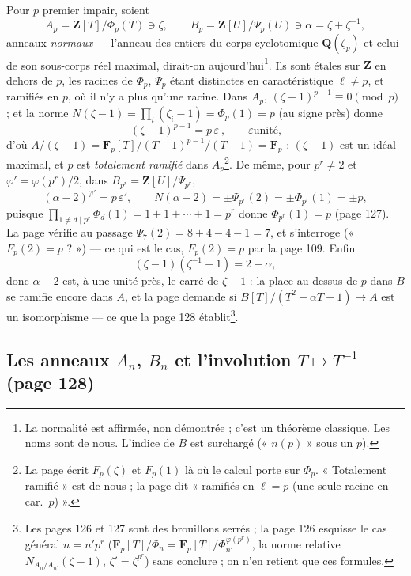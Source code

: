 \documentclass[11pt,a4paper]{article}
\begin{document}
Pour $p$ premier impair, soient
\[
  A_p = \mathbf{Z}[T]/\Phi_p(T) \ni \zeta, \qquad B_p = \mathbf{Z}[U]/\Psi_p(U)
  \ni \alpha = \zeta + \zeta^{-1} ,
\]
anneaux \emph{normaux} --- l'anneau des entiers du corps cyclotomique
$\mathbf{Q}(\zeta_p)$ et celui de son sous-corps réel maximal, dirait-on
aujourd'hui\footnote{La normalité est affirmée, non démontrée ; c'est un
théorème classique. Les noms sont de nous. L'indice de $B$ est surchargé
(« $n(p)$ » sous un $p$).}. Ils sont étales sur $\mathbf{Z}$ en dehors de $p$,
les racines de $\Phi_p$, $\Psi_p$ étant distinctes en caractéristique $\ell
\neq p$, et ramifiés en $p$, où il n'y a plus qu'une racine. Dans $A_p$,
$(\zeta - 1)^{p-1} \equiv 0 \pmod p$ ; et la norme $N(\zeta - 1) =
\prod_{i}(\zeta_i - 1) = \Phi_p(1) = p$ (au signe près) donne
\[
  \boxed{\ (\zeta - 1)^{p-1} = p\, \varepsilon\ }, \qquad \varepsilon \text{
  unité} ,
\]
d'où $A/(\zeta - 1) = \mathbf{F}_p[T]/(T - 1)^{p-1}/(T - 1) = \mathbf{F}_p$ :
$(\zeta - 1)$ est un idéal maximal, et $p$ est \emph{totalement ramifié} dans
$A_p$\footnote{La page écrit $F_p(\zeta)$ et $F_p(1)$ là où le calcul porte sur
$\Phi_p$. « Totalement ramifié » est de nous ; la page dit « ramifiés en
$\ell = p$ (une seule racine en car.\ $p$) ».}. De même, pour $p^r \neq 2$ et
$\varphi' = \varphi(p^r)/2$, dans $B_{p^r} = \mathbf{Z}[U]/\Psi_{p^r}$,
\[
  (\alpha - 2)^{\varphi'} = p\, \varepsilon', \qquad N(\alpha - 2) = \pm
  \Psi_{p^r}(2) = \pm \Phi_{p^r}(1) = \pm p ,
\]
puisque $\prod_{1 \neq d \mid p^r} \Phi_d(1) = 1 + 1 + \cdots + 1 = p^r$
donne $\Phi_{p^r}(1) = p$ (page 127). La page vérifie au passage
$\Psi_7(2) = 8 + 4 - 4 - 1 = 7$, et s'interroge (« $F_p(2) = p$ ? ») --- ce
qui est le cas, $F_p(2) = p$ par la page 109. Enfin
\[
  (\zeta - 1)(\zeta^{-1} - 1) = 2 - \alpha ,
\]
donc $\alpha - 2$ est, à une unité près, le carré de $\zeta - 1$ : la place
au-dessus de $p$ dans $B$ se ramifie encore dans $A$, et la page demande si
$B[T]/(T^2 - \alpha T + 1) \to A$ est un isomorphisme --- ce que la page 128
établit\footnote{Les pages 126 et 127 sont des brouillons serrés ; la page 126
esquisse le cas général $n = n' p^r$ ($\mathbf{F}_p[T]/\Phi_n =
\mathbf{F}_p[T]/\Phi_{n'}^{\varphi(p^r)}$, la norme relative
$N_{A_n/A_{n'}}(\zeta - 1)$, $\zeta' = \zeta^{p^r}$) sans conclure ; on n'en
retient que ces formules.}.

\subsection*{Les anneaux $A_n$, $B_n$ et l'involution $T \mapsto T^{-1}$ (page 128)}
\end{document}
